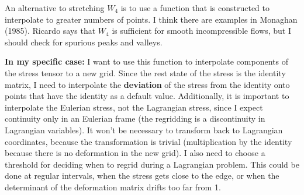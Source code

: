\documentclass[12pt]{article}
\begin{document}
	An alternative to stretching $W_4$ is to use a function that is constructed to interpolate to greater numbers of points. I think there are examples in Monaghan (1985). Ricardo says that $W_4$ is sufficient for smooth incompressible flows, but I should check for spurious peaks and valleys.
	
	\textbf{In my specific case:} I want to use this function to interpolate components of the stress tensor to a new grid. Since the rest state of the stress is the identity matrix, I need to interpolate the \textbf{deviation} of the stress from the identity onto points that have the identity as a default value. Additionally, it is important to interpolate the Eulerian stress, not the Lagrangian stress, since I expect continuity only in an Eulerian frame (the regridding is a discontinuity in Lagrangian variables). It won't be necessary to transform back to Lagrangian coordinates, because the transformation is trivial (multiplication by the identity because there is no deformation in the new grid). I also need to choose a threshold for deciding when to regrid during a Lagrangian problem. This could be done at regular intervals, when the stress gets close to the edge, or when the determinant of the deformation matrix drifts too far from 1. 
\end{document}
